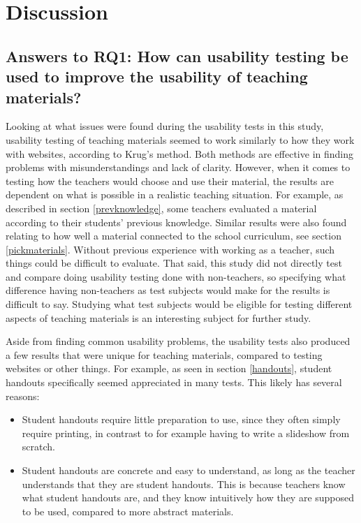 \chapter{Discussion}

\section{Answers to RQ1: How can usability testing be used to improve the usability of teaching materials?}

Looking at what issues were found during the usability tests in this study, usability testing of teaching materials seemed to work similarly to how they work with websites, according to Krug's method. Both methods are effective in finding problems with misunderstandings and lack of clarity. However, when it comes to testing how the teachers would choose and use their material, the results are dependent on what is possible in a realistic teaching situation. For example, as described in section \ref{prevknowledge}, some teachers evaluated a material according to their students' previous knowledge. Similar results were also found relating to how well a material connected to the school curriculum, see section \ref{pickmaterials}. Without previous experience with working as a teacher, such things could be difficult to evaluate. That said, this study did not directly test and compare doing usability testing done with non-teachers, so specifying what difference having non-teachers as test subjects would make for the results is difficult to say. Studying what test subjects would be eligible for testing different aspects of teaching materials is an interesting subject for further study.

Aside from finding common usability problems, the usability tests also produced a few results that were unique for teaching materials, compared to testing websites or other things. For example, as seen in section \ref{handouts}, student handouts specifically seemed appreciated in many tests. This likely has several reasons:

\begin{itemize}
	\item Student handouts require little preparation to use, since they often simply require printing, in contrast to for example having to write a slideshow from scratch.
	\item Student handouts are concrete and easy to understand, as long as the teacher understands that they are student handouts. This is because teachers know what student handouts are, and they know intuitively how they are supposed to be used, compared to more abstract materials.
\end{itemize}

